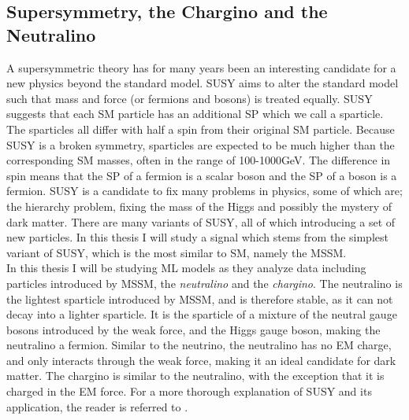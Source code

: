 \subsection{Supersymmetry, the Chargino and the Neutralino}\label{subsec:SS}
A supersymmetric theory has for many years been an interesting candidate for a new physics beyond the standard 
model. \ac{SUSY} aims to alter the standard model such that mass and force (or fermions and bosons) is treated equally. 
\ac{SUSY} suggests that each \ac{SM} particle has an additional \ac{SP} which we call a sparticle. 
The sparticles all differ with half a spin from their original \ac{SM} particle. Because \ac{SUSY} is a broken symmetry, 
sparticles are expected to be much higher than the corresponding \ac{SM} masses, often in the range of 100-1000GeV. 
The difference in spin means that the \ac{SP} of a fermion is a scalar boson and the \ac{SP} of a boson is a fermion. \ac{SUSY} is a 
candidate to fix many problems in physics, some of which are; the hierarchy problem, fixing the mass of the Higgs 
and possibly the mystery of dark matter. There are many variants of \ac{SUSY}, all of which introducing a set of new 
particles. In this thesis I will study a signal which stems from the simplest variant of \ac{SUSY}, which is the most 
similar to \ac{SM}, namely the \ac{MSSM}. 
\\
In this thesis I will be studying \ac{ML} models as they analyze data including particles introduced by \ac{MSSM}, the \emph{neutralino} and 
the \emph{chargino}. The neutralino is the lightest sparticle introduced by \ac{MSSM}, and is therefore stable, as it can not decay into a lighter sparticle. 
It is the sparticle of a mixture of the neutral gauge bosons introduced by the weak force, and the Higgs gauge boson, making the neutralino a 
fermion. Similar to the neutrino, the neutralino has no \ac{EM} charge, and only interacts through the weak force, making it an ideal candidate 
for dark matter. The chargino is similar to the neutralino, with the exception that it is charged in the \ac{EM} force. 
For a more thorough explanation of \ac{SUSY} and its application, the reader is referred to \cite{SUSY}. 